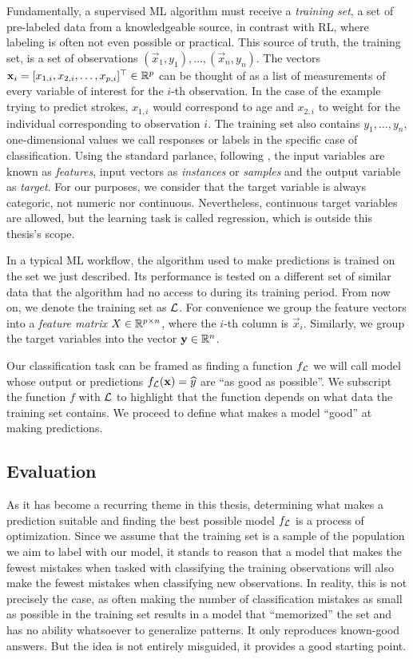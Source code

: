 Fundamentally, a supervised ML algorithm must receive a \textit{training set}, a
set of pre-labeled data from a knowledgeable source, in contrast with RL, where
labeling is often not even possible or practical. This source of truth, the
training set, is a set of observations $(\vec{x}_1, y_1), \dots, (\vec{x}_n,
y_n)$. The vectors $\mathbf{x}_i = [x_{1, i}, x_{2, i}, \dots, x_{p, i}]^{\top} \in
\mathbb{R}^{p}$ can be thought of as a list of measurements of every variable of
interest for the $i$-th observation. In the case of the example trying to
predict strokes, $x_{1, i}$ would correspond to age and $x_{2, i}$ to weight for
the individual corresponding to observation $i$. The training set also contains
$y_1, \dots, y_n$, one-dimensional values we call responses or labels in the
specific case of classification. Using the standard parlance, following
\cite{louppe2014}, the input variables are known as \textit{features}, input
vectors as \textit{instances} or \textit{samples} and the output variable as
\textit{target}. For our purposes, we consider that the target variable is
always categoric, not numeric nor continuous. Nevertheless, continuous target
variables are allowed, but the learning task is called regression, which is
outside this thesis's scope.

In a typical ML workflow, the algorithm used to make predictions is trained on
the set we just described. Its performance is tested on a different set of
similar data that the algorithm had no access to during its training period.
From now on, we denote the training set as $\mathcal{L}$. For convenience we group the
feature vectors into a \textit{feature matrix} $X \in \mathbb{R}^{p \times n}$, where
the $i$-th column is $\vec{x}_i$. Similarly, we group the target variables into
the vector $\mathbf{y} \in \mathbb{R}^{n}$.

Our classification task can be framed as finding a function $f_{\mathcal{L}}$ we will
call model whose output or predictions $f_{\mathcal{L}} (\mathbf{x}) = \widehat{y}$
are ``as good as possible''. We subscript the function $f$ with $\mathcal{L}$ to
highlight that the function depends on what data the training set contains. We
proceed to define what makes a model ``good'' at making predictions.

\subsection{Evaluation}

As it has become a recurring theme in this thesis, determining what makes a
prediction suitable and finding the best possible model $f_{\mathcal{L}}$ is a process of
optimization. Since we assume that the training set is a sample of the
population we aim to label with our model, it stands to reason that a model that
makes the fewest mistakes when tasked with classifying the training observations
will also make the fewest mistakes when classifying new observations. In
reality, this is not precisely the case, as often making the number of
classification mistakes as small as possible in the training set results in a
model that ``memorized'' the set and has no ability whatsoever to generalize
patterns. It only reproduces known-good answers. But the idea is not entirely
misguided, it provides a good starting point.

